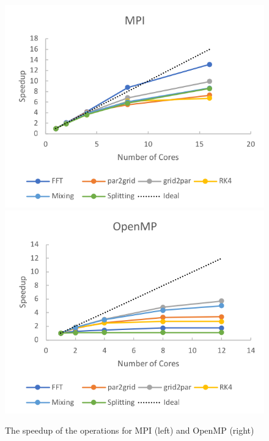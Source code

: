 \documentclass{article}
\begin{document}
\begin{figure}
  \begin{center}
    \includegraphics[scale=0.8]{pmpic_images/MPISingle.png}
    \includegraphics[scale=0.8]{pmpic_images/openmpSingle.png}
  \end{center}
  \caption{The speedup of the operations for MPI (left) and OpenMP (right)}
  \label{1 node operations}
\end{figure}
\end{document}
